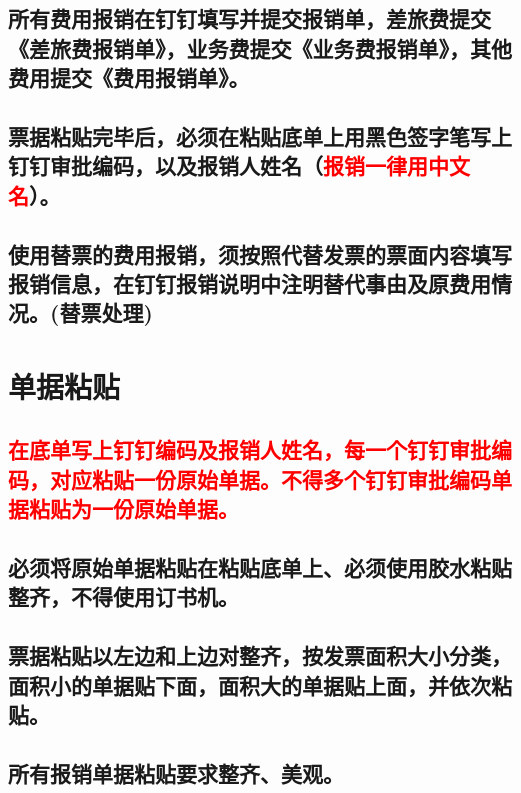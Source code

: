 \documentclass[16pt]{article}
\begin{document}
\subsection{所有费用报销在钉钉填写并提交报销单，差旅费提交《差旅费报销单》，业务费提交《业务费报销单》，其他费用提交《费用报销单》。}
\subsection{票据粘贴完毕后，必须在粘贴底单上用黑色签字笔写上钉钉审批编码，以及报销人姓名（\textcolor{red}{报销一律用中文名}）。}
\subsection{使用替票的费用报销，须按照代替发票的票面内容填写报销信息，在钉钉报销说明中注明替代事由及原费用情况。(替票处理)}

\section{单据粘贴}
\subsection{\textcolor{red}{在底单写上钉钉编码及报销人姓名，每一个钉钉审批编码，对应粘贴一份原始单据。不得多个钉钉审批编码单据粘贴为一份原始单据。}}
\subsection{必须将原始单据粘贴在粘贴底单上、必须使用胶水粘贴整齐，不得使用订书机。 }
\subsection{票据粘贴以左边和上边对整齐，按发票面积大小分类，面积小的单据贴下面，面积大的单据贴上面，并依次粘贴。}
\subsection{所有报销单据粘贴要求整齐、美观。} 
\end{document}
